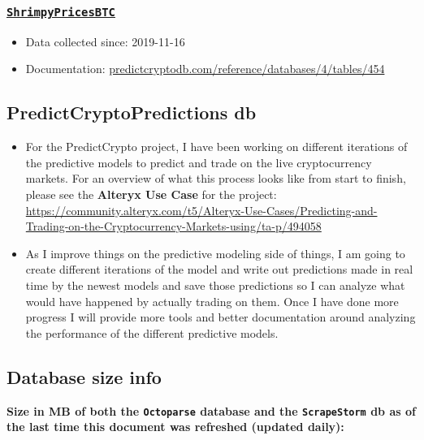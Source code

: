 \documentclass[
]{book}
\begin{document}
\hypertarget{shrimpypricesbtc}{%
\subsubsection{\texorpdfstring{\href{https://predictcryptodb.com/question/9}{\textbf{\texttt{ShrimpyPricesBTC}}}}{ShrimpyPricesBTC}}\label{shrimpypricesbtc}}

\begin{itemize}
\item
  Data collected since: 2019-11-16
\item
  Documentation: \href{https://predictcryptodb.com/reference/databases/4/tables/454}{predictcryptodb.com/reference/databases/4/tables/454}
\end{itemize}

\hypertarget{predictcryptopredictions-db}{%
\subsection{PredictCryptoPredictions db}\label{predictcryptopredictions-db}}

\begin{itemize}
\item
  For the PredictCrypto project, I have been working on different iterations of the predictive models to predict and trade on the live cryptocurrency markets. For an overview of what this process looks like from start to finish, please see the \textbf{Alteryx Use Case} for the project: \url{https://community.alteryx.com/t5/Alteryx-Use-Cases/Predicting-and-Trading-on-the-Cryptocurrency-Markets-using/ta-p/494058}
\item
  As I improve things on the predictive modeling side of things, I am going to create different iterations of the model and write out predictions made in real time by the newest models and save those predictions so I can analyze what would have happened by actually trading on them. Once I have done more progress I will provide more tools and better documentation around analyzing the performance of the different predictive models.
\end{itemize}

\hypertarget{database-size-info}{%
\subsection{Database size info}\label{database-size-info}}

\textbf{Size in MB of both the \texttt{Octoparse} database and the \texttt{ScrapeStorm} db as of the last time this document was refreshed (updated daily):}
\end{document}
